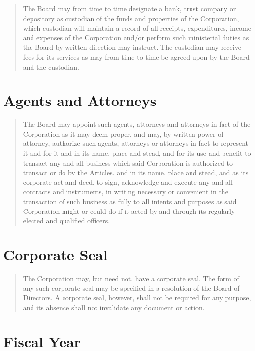 \documentclass[
]{book}
\begin{document}
\begin{quote}
The Board may from time to time designate a bank, trust company or
depository as custodian of the funds and properties of the
Corporation, which custodian will maintain a record of all receipts,
expenditures, income and expenses of the Corporation and/or perform
such ministerial duties as the Board by written direction may
instruct. The custodian may receive fees for its services as may from
time to time be agreed upon by the Board and the custodian.
\end{quote}

\section{Agents and Attorneys}\label{agents-and-attorneys}

\begin{quote}
The Board may appoint such agents, attorneys and attorneys in fact of
the Corporation as it may deem proper, and may, by written power of
attorney, authorize such agents, attorneys or attorneys-in-fact to
represent it and for it and in its name, place and stead, and for its
use and benefit to transact any and all business which said
Corporation is authorized to transact or do by the Articles, and in
its name, place and stead, and as its corporate act and deed, to sign,
acknowledge and execute any and all contracts and instruments, in
writing necessary or convenient in the transaction of such business as
fully to all intents and purposes as said Corporation might or could
do if it acted by and through its regularly elected and qualified
officers.
\end{quote}

\section{Corporate Seal}\label{corporate-seal}

\begin{quote}
The Corporation may, but need not, have a corporate seal. The form of
any such corporate seal may be specified in a resolution of the Board
of Directors. A corporate seal, however, shall not be required for any
purpose, and its absence shall not invalidate any document or action.
\end{quote}

\section{Fiscal Year}\label{fiscal-year}
\end{document}
